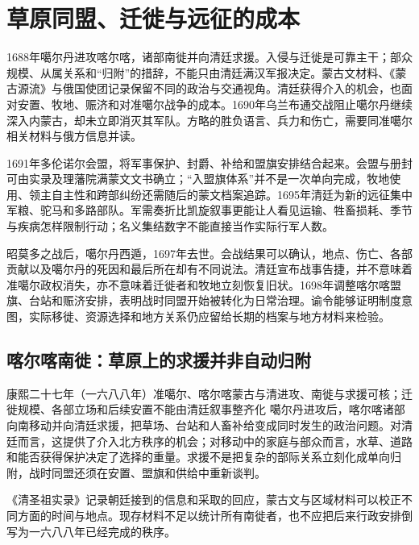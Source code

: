 \section{草原同盟、迁徙与远征的成本}

1688年噶尔丹进攻喀尔喀，诸部南徙并向清廷求援。入侵与迁徙是可靠主干；部众规模、从属关系和“归附”的措辞，不能只由清廷满汉军报决定。蒙古文材料、《蒙古源流》与俄国使团记录保留不同的政治与交通视角。清廷获得介入的机会，也面对安置、牧地、赈济和对准噶尔战争的成本。1690年乌兰布通交战阻止噶尔丹继续深入内蒙古，却未立即消灭其军队。方略的胜负语言、兵力和伤亡，需要同准噶尔相关材料与俄方信息并读。

1691年多伦诺尔会盟，将军事保护、封爵、补给和盟旗安排结合起来。会盟与册封可由实录及理藩院满蒙文文书确立；“入盟旗体系”并不是一次单向完成，牧地使用、领主自主性和跨部纠纷还需随后的蒙文档案追踪。1695年清廷为新的远征集中军粮、驼马和多路部队。军需奏折比凯旋叙事更能让人看见运输、牲畜损耗、季节与疾病怎样限制行动；名义集结数字不能直接当作实际行军人数。

昭莫多之战后，噶尔丹西遁，1697年去世。会战结果可以确认，地点、伤亡、各部贡献以及噶尔丹的死因和最后所在却有不同说法。清廷宣布战事告捷，并不意味着准噶尔政权消失，亦不意味着迁徙者和牧地立刻恢复旧状。1698年调整喀尔喀盟旗、台站和赈济安排，表明战时同盟开始被转化为日常治理。谕令能够证明制度意图，实际移徙、资源选择和地方关系仍应留给长期的档案与地方材料来检验。

\subsection{喀尔喀南徙：草原上的求援并非自动归附}
\begin{event}{}{康熙二十七年（一六八八年）}{准噶尔、喀尔喀蒙古与清}{进攻、南徙与求援可核；迁徙规模、各部立场和后续安置不能由清廷叙事整齐化}
噶尔丹进攻后，喀尔喀诸部向南移动并向清廷求援，把草场、台站和人畜补给变成同时发生的政治问题。对清廷而言，这提供了介入北方秩序的机会；对移动中的家庭与部众而言，水草、道路和能否获得保护决定了选择的重量。求援不是把复杂的部际关系立刻化成单向归附，战时同盟还须在安置、盟旗和供给中重新谈判。

《清圣祖实录》记录朝廷接到的信息和采取的回应，蒙古文与区域材料可以校正不同方面的时间与地点。现存材料不足以统计所有南徙者，也不应把后来行政安排倒写为一六八八年已经完成的秩序。
\end{event}